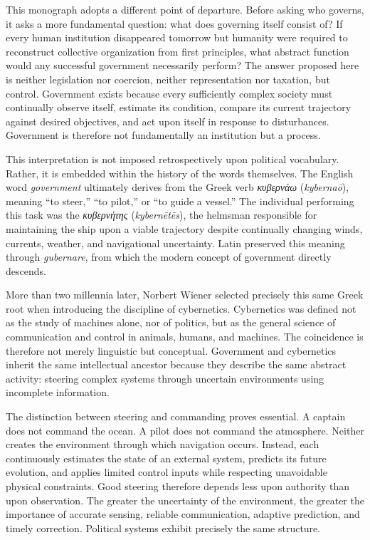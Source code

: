 \documentclass[12pt,a4paper]{article}
\begin{document}
This monograph adopts a different point of departure. Before asking who governs, it asks a more fundamental question: what does governing itself consist of? If every human institution disappeared tomorrow but humanity were required to reconstruct collective organization from first principles, what abstract function would any successful government necessarily perform? The answer proposed here is neither legislation nor coercion, neither representation nor taxation, but control. Government exists because every sufficiently complex society must continually observe itself, estimate its condition, compare its current trajectory against desired objectives, and act upon itself in response to disturbances. Government is therefore not fundamentally an institution but a process.

This interpretation is not imposed retrospectively upon political vocabulary. Rather, it is embedded within the history of the words themselves. The English word \emph{government} ultimately derives from the Greek verb \emph{κυβερνάω} (\emph{kybernaō}), meaning ``to steer,'' ``to pilot,'' or ``to guide a vessel.'' The individual performing this task was the \emph{κυβερνήτης} (\emph{kybernētēs}), the helmsman responsible for maintaining the ship upon a viable trajectory despite continually changing winds, currents, weather, and navigational uncertainty. Latin preserved this meaning through \emph{gubernare}, from which the modern concept of government directly descends.

More than two millennia later, Norbert Wiener selected precisely this same Greek root when introducing the discipline of cybernetics. Cybernetics was defined not as the study of machines alone, nor of politics, but as the general science of communication and control in animals, humans, and machines. The coincidence is therefore not merely linguistic but conceptual. Government and cybernetics inherit the same intellectual ancestor because they describe the same abstract activity: steering complex systems through uncertain environments using incomplete information.

The distinction between steering and commanding proves essential. A captain does not command the ocean. A pilot does not command the atmosphere. Neither creates the environment through which navigation occurs. Instead, each continuously estimates the state of an external system, predicts its future evolution, and applies limited control inputs while respecting unavoidable physical constraints. Good steering therefore depends less upon authority than upon observation. The greater the uncertainty of the environment, the greater the importance of accurate sensing, reliable communication, adaptive prediction, and timely correction. Political systems exhibit precisely the same structure.
\end{document}
